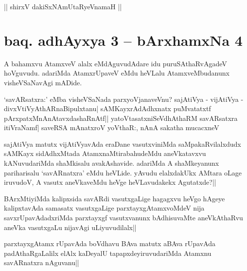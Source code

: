 \begin{center}
|| shirxV dakiSxNAmUtaRyeVnamaH ||
\end{center}

\section*{baq. adhAyxya 3 -- bArxhamxNa 4}%




\begin{artha}
A bahamxvu AtamxveV alalx eMdAguvudAdare idu puruSAthaRvAgadeV hoVguvudu. adariMda AtamxrUpaveV eMdu heVLalu 
AtamxveMbudanunx visheVSaNavAgi mADide.

`savARsatxra:' eMba visheVSaNada parxyoVjanaveVnu? sajAtiVya - vijAtiVya - divxVtiVyAthARnaBipulxtanu|
sAMKayxrAdAdhxnatx puMvatatxtf pArxpatxMnAnAtavxdashaRnAtf|| yatoV\s tasatxniSeVdhAthaRM savARsatxra itiVraNamf|
saveRSA mAnatxroV yoV\s thaR:, nAnA sakatha mucacxneV 

sajAtiVya matutx vijAtiVyavAda eraDane vasutxviniMda saMpakaRvilalxdudx sAMKayx sidAdhxMtada AtamxnaMtirabahudeMdu
aneVkatavxvu kANuvudariMda shaMkisalu avakAshavide. adariMda A shaMkeyanunx pariharisalu `savARnatxra' eMdu heVLide. yAvudu elalxdakUkx AMtara oLage iruvudoV, A vasutx aneVkaveMdu heVge heVLavudakekx Agutatxde?||
\end{artha}


\begin{artha}%
BArxMtiyiMda kalipxsida savARdi vasutxgaLige hagagxvu heVgo hAgeye kalipxtavAda samasatx vasutxgaLige parxtayxgAtamxvoMdeV nija savxrUpavAdadxriMda parxtayxgf vasutxvanunx bAdhisuvaMte 
aneVkAthaRvu aneVka vasutxgaLu nijavAgi uLiyuvudilalx||
\end{artha}


\begin{artha}
parxtayxgAtamx rUpavAda boVdhavu BAva matutx aBAva rUpavAda padAthaRgaLalilx elAlx kaDeyalU tapapxdeyiruvudariMda 
Atamxnu savARnatxra nAguvanu||
\end{artha}



